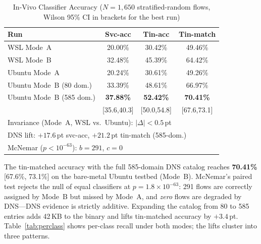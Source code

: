 \documentclass[conference]{IEEEtran}
\begin{document}
\begin{table}[t]
\caption{In-Vivo Classifier Accuracy ($N=1{,}650$ stratified-random flows,
Wilson 95\% CI in brackets for the best run)}
\label{tab:invivo}
\centering
\scriptsize
{\setlength{\tabcolsep}{3pt}
\begin{tabular}{l|ccc}
\toprule
\textbf{Run} & \textbf{Svc-acc} & \textbf{Tin-acc} & \textbf{Tin-match} \\
\midrule
WSL    Mode~A             & 20.00\% & 30.42\% & 49.46\% \\
WSL    Mode~B             & 32.48\% & 45.39\% & 64.42\% \\
Ubuntu Mode~A             & 20.24\% & 30.61\% & 49.26\% \\
Ubuntu Mode~B (80 dom.)   & 33.39\% & 48.61\% & 66.97\% \\
Ubuntu Mode~B (585 dom.)  & \textbf{37.88\%} & \textbf{52.42\%} & \textbf{70.41\%} \\
                          & [35.6,40.3] & [50.0,54.8] & [67.6,73.1] \\
\midrule
\multicolumn{4}{l}{\scriptsize Invariance (Mode~A, WSL vs.\ Ubuntu): $|\Delta|<0.5$\,pt} \\
\multicolumn{4}{l}{\scriptsize DNS lift: $+17.6$\,pt svc-acc, $+21.2$\,pt tin-match (585-dom.)} \\
\multicolumn{4}{l}{\scriptsize McNemar ($p<10^{-63}$): $b{=}291$, $c{=}0$} \\
\bottomrule
\end{tabular}}
\end{table}

The tin-matched accuracy with the full 585-domain DNS catalog reaches
\textbf{70.41\%} [67.6\%, 73.1\%] on the bare-metal Ubuntu testbed
(Mode~B).
McNemar's paired test rejects the null of equal classifiers at
$p=1.8{\times}10^{-63}$: 291 flows are correctly assigned by Mode~B
but missed by Mode~A, and \emph{zero} flows are degraded by DNS---DNS
evidence is strictly additive.
Expanding the catalog from 80 to 585 entries adds 42\,KB to the binary
and lifts tin-matched accuracy by $+3.4$\,pt.
Table~\ref{tab:perclass} shows per-class recall under both modes; the
lifts cluster into three patterns.
\end{document}
